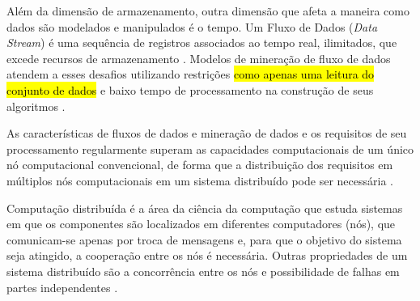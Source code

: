 Além da dimensão de armazenamento, outra dimensão que afeta a maneira como dados
são modelados e manipulados é o tempo. Um Fluxo de Dados (\emph{Data Stream}) é
uma sequência de registros
associados ao tempo
real, ilimitados, que excede recursos de armazenamento \cite{Gaber2005}.
Modelos de mineração de fluxo de dados atendem a esses desafios utilizando
restrições \hl{como apenas uma leitura do conjunto de dados} e baixo tempo de
processamento na construção de seus algoritmos \cite{Gama2007, Gaber2005}.




As características de fluxos de dados e mineração de dados e os requisitos de
seu processamento regularmente superam as capacidades computacionais de um único
nó computacional convencional, de forma que a distribuição dos requisitos em
múltiplos nós computacionais em um sistema distribuído pode ser necessária
\cite{Gaber2005}.

Computação distribuída é a área da ciência da computação que estuda sistemas
em que os componentes são localizados em diferentes computadores (nós), que
comunicam-se apenas por troca de mensagens e, para que o objetivo do sistema
seja atingido, a cooperação entre os nós é necessária.
Outras propriedades de um sistema distribuído são a concorrência entre os nós e
possibilidade de
falhas em partes independentes \cite{TanenbaumSteen2018}.


 

